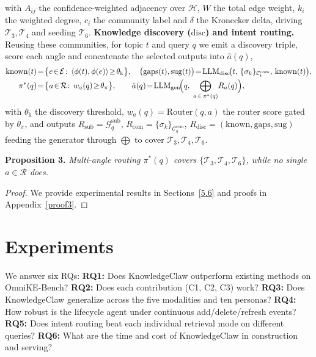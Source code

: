 \documentclass{article}
\begin{document}
with $A_{ij}$ the confidence-weighted adjacency over $\mathcal{H}$, $W$ the total edge weight, $k_i$ the weighted degree, $c_i$ the community label and $\delta$ the Kronecker delta, driving $\mathcal{T}_3,\mathcal{T}_4$ and seeding $\mathcal{T}_6$. \textbf{Knowledge discovery ($\mathrm{disc}$) and intent routing.} Reusing these communities, for topic $t$ and query $q$ we emit a discovery triple, score each angle and concatenate the selected outputs into $\hat{a}(q)$,
\begin{equation}
\begin{aligned}
\mathrm{known}(t)&\!=\!\bigl\{e\!\in\!\mathcal{E}\!:\,\langle\phi(t),\phi(e)\rangle\!\geq\!\theta_{\mathrm{k}}\bigr\},\quad
\bigl(\mathrm{gaps}(t),\mathrm{sug}(t)\bigr)\!=\!\mathrm{LLM}_{\mathrm{disc}}\!\bigl(t,\,\{\sigma_k\}_{\mathcal{C}_t^{\mathrm{com}}},\,\mathrm{known}(t)\bigr),\\[-1pt]
\pi^{*}(q)&\!=\!\bigl\{a\!\in\!\mathcal{R}\!:\,w_a(q)\!\geq\!\theta_{\pi}\bigr\},\qquad
\hat{a}(q)\!=\!\mathrm{LLM}_{\mathrm{gen}}\!\Bigl(q,\;\bigoplus_{a\,\in\,\pi^{*}(q)}\!R_a(q)\Bigr),
\end{aligned}
\label{eq:disc-route}
\end{equation}
with $\theta_{\mathrm{k}}$ the discovery threshold, $w_a(q)\!=\!\mathrm{Router}(q,a)$ the router score gated by $\theta_{\pi}$, and outputs $R_{\mathrm{sub}}\!=\!\mathcal{G}_q^{\mathrm{sub}}$, $R_{\mathrm{com}}\!=\!\{\sigma_k\}_{\mathcal{C}_q^{\mathrm{com}}}$, $R_{\mathrm{disc}}\!=\!(\mathrm{known},\mathrm{gaps},\mathrm{sug})$ feeding the generator through $\bigoplus$ to cover $\mathcal{T}_3,\mathcal{T}_4,\mathcal{T}_6$.

\textbf{Proposition 3.} \textit{Multi-angle routing $\pi^{*}(q)$ covers $\{\mathcal{T}_3,\mathcal{T}_4,\mathcal{T}_6\}$, while no single $a\!\in\!\mathcal{R}$ does.}\nopagebreak[4]\vspace{-2mm}\nopagebreak[4]
\begin{proof}
We provide experimental results in Sections~\ref{5.6} and proofs in Appendix~\ref{proof3}.
\end{proof}

\section{Experiments}
\label{sec:exp}

We answer six RQs:
\textbf{RQ1:} Does KnowledgeClaw outperform existing methods on OmniKE-Bench?
\textbf{RQ2:} Does each contribution (C1, C2, C3) work?
\textbf{RQ3:} Does KnowledgeClaw generalize across the five modalities and ten personas?
\textbf{RQ4:} How robust is the lifecycle agent under continuous add/delete/refresh events?
\textbf{RQ5:} Does intent routing beat each individual retrieval mode on different queries?
\textbf{RQ6:} What are the time and cost of KnowledgeClaw in construction and serving?
\end{document}
